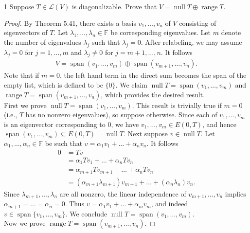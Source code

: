 \documentclass{extarticle}
\newenvironment{problem}[1]{\begin{prob*}{#1}{}}{\end{prob*}}
\newcommand{\F}{\mathbb{F}}
\DeclareMathOperator{\Span}{span}
\newcommand{\Hom}{\mathcal{L}}
\DeclareMathOperator{\Null}{null}
\DeclareMathOperator{\Range}{range}
\begin{document}
\begin{problem}{1}
Suppose $T\in\Hom(V)$ is diagonalizable.  Prove that $V = \Null T\oplus\Range T$.
\end{problem}
\begin{proof}
By Theorem 5.41, there exists a basis $v_1,\dots, v_n$ of $V$ consisting of eigenvectors of $T$.  Let $\lambda_1,\dots, \lambda_n\in\F$ be corresponding eigenvalues.   Let $m$ denote the number of eigenvalues $\lambda_j$ such that $\lambda_j = 0$.  After relabeling, we may assume $\lambda_j = 0$ for $j=1,\dots, m$ and $\lambda_j \neq 0$ for $j = m+1,\dots,n$.  It follows
\begin{align*}
V = \Span(v_1,\dots, v_m)\oplus \Span(v_{m+1},\dots,v_n).
\end{align*}
Note that if $m = 0$, the left hand term in the direct sum becomes the span of the empty list, which is defined to be $\{0\}$.  We claim $\Null T =  \Span(v_1,\dots, v_m)$ and $\Range T = \Span(v_{m+1},\dots,v_n)$, which provides the desired result.\\
\indent First we prove $\Null T = \Span(v_1,\dots, v_m)$.  This result is trivially true if $m=0$ (i.e., $T$ has no nonzero eigenvalues), so suppose otherwise.  Since each of $v_1,\dots,v_m$ is an eigenvector corresponding to $0$, we have $v_1,\dots,v_m\in E(0,T)$, and hence $\Span(v_1,\dots,v_m)\subseteq E(0, T)=\Null T$.  Next suppose $v\in \Null T$.  Let $\alpha_1,\dots,\alpha_n\in\F$ be such that $v = \alpha_1v_1 + \dots + \alpha_nv_n$.  It follows
\begin{align*}
0 &= Tv\\
&= \alpha_1Tv_1 + \dots + \alpha_nTv_n\\
&= \alpha_{m+1}Tv_{m+1} + \dots + \alpha_nTv_n\\
&= (\alpha_{m+1}\lambda_{m+1})v_{m+1} + \dots + (\alpha_n\lambda_n) v_n.
\end{align*}
Since $\lambda_{m+1},\dots, \lambda_{n}$ are all nonzero, the linear independence of $v_{m+1},\dots, v_{n}$ implies $\alpha_{m+1} = \dots = \alpha_n = 0$.  Thus $v = \alpha_1v_1 + \dots + \alpha_mv_m$, and indeed $v\in\Span\{v_1,\dots,v_m\}$.  We conclude $\Null T = \Span(v_1,\dots, v_m)$.\\
\indent Now we prove $\Range T = \Span(v_{m+1},\dots, v_n)$.  
\end{proof}
\end{document}

